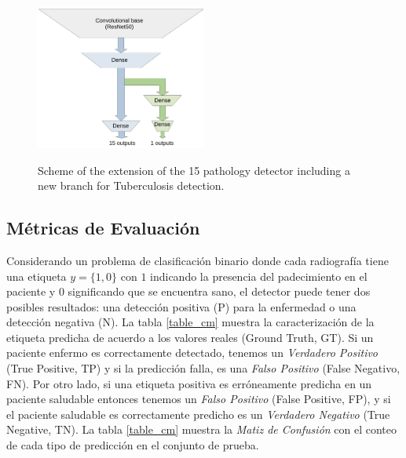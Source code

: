 {\begin{figure}[htp]
    \centering
    {\includegraphics[width=0.5\textwidth]{Chapters/4. ViT-Lung/images/tb_net.pdf}}
\caption{Scheme of the extension of the 15 pathology detector including a new branch for Tuberculosis detection.}
\label{net_tb}
\end{figure}


\subsection{Métricas de Evaluación} \label{sec_metrics}

Considerando un problema de clasificación binario donde cada radiografía tiene una etiqueta
$y = \{1, 0\}$ con $1$ indicando la presencia del padecimiento en el paciente y $0$ significando
que se encuentra sano, el detector puede tener dos posibles resultados: una detección positiva (P)
para la enfermedad o una detección negativa (N). La tabla \ref{table_cm} muestra la caracterización
de la etiqueta predicha de acuerdo a los valores reales (Ground Truth, GT). Si un paciente enfermo
es correctamente detectado, tenemos un \textit{Verdadero Positivo} (True Positive, TP) y si la
predicción falla, es una \textit{Falso Positivo} (False Negativo, FN). Por otro lado, si una etiqueta
positiva es erróneamente predicha en un paciente saludable entonces tenemos un \textit{Falso Positivo}
(False Positive, FP), y si el paciente saludable es correctamente predicho es un
\textit{Verdadero Negativo} (True Negative, TN). La tabla \ref{table_cm} muestra la \textit{Matiz de
Confusión} con el conteo de cada tipo de predicción en el conjunto de prueba.

}
